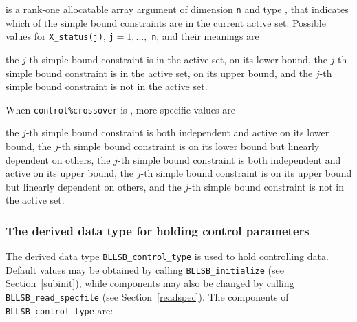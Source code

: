 \documentclass{galahad}
\newcommand{\packagename}{BLLSB}
\begin{document}
\begin{description}
 is a rank-one allocatable array argument of dimension {\tt n}
and type \integer, that indicates which of the simple bound
constraints are in the current active set. Possible values for
{\tt X\_status(j)}, {\tt j}$=1, \ldots ,$ {\tt n}, and their meanings are
\begin{description}
 the $j$-th simple bound constraint
is in the active set, on its lower bound,
 the $j$-th simple bound constraint
is in the active set, on its upper bound, and
  the $j$-th simple bound constraint is not in the active set.
\end{description}
When {\tt control\%crossover} is \true, more specific values are
\begin{description}
 the $j$-th simple bound constraint
is both independent and active on its lower bound,
 the $j$-th simple bound constraint
is on its lower bound but linearly dependent on others,
 the $j$-th simple bound constraint
is both independent and active on its upper bound,
 the $j$-th simple bound constraint
is on its upper bound but linearly dependent on others, and
 the $j$-th simple bound constraint is not in the active set.
\end{description}

\end{description}


\subsubsection{The derived data type for holding control
 parameters}\label{typecontrol}
The derived data type
{\tt \packagename\_control\_type}
is used to hold controlling data. Default values may be obtained by calling
{\tt \packagename\_initialize}
(see Section~\ref{subinit}),
while components may also be changed by calling
{\tt \packagename\_read\-\_specfile}
(see Section~\ref{readspec}).
The components of
{\tt \packagename\_control\_type}
are:
\end{document}
